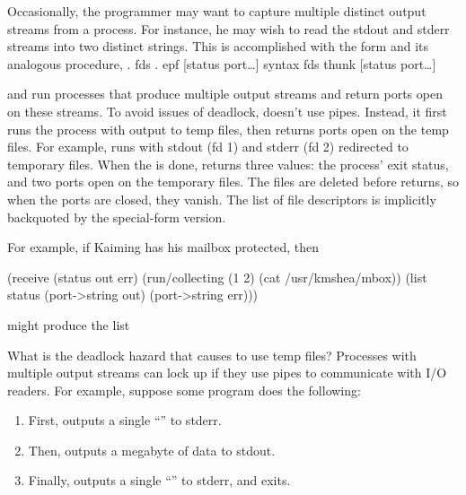 Occasionally, the programmer may want to capture multiple distinct output
streams from a process. For instance, he may wish to read the stdout and
stderr streams into two distinct strings. This is accomplished with the
 form and its analogous procedure, .
%
  {fds . epf} {[status port\ldots]} {syntax}
 {fds thunk} {[status port\ldots]}
\begin{desc}
 and  run processes that produce
multiple output streams and return ports open on these streams.  To avoid
issues of deadlock,  doesn't use pipes. Instead, it first
runs the process with output to temp files, then returns ports open on the
temp files. For example,
%
%
runs  with stdout (fd 1) and stderr (fd 2) redirected to temporary
files.
When the  is done,  returns three values: the
 process' exit status, and two ports open on the temporary files. The
files are deleted before  returns, so when the ports are
closed, they vanish. The  list of file descriptors is implicitly
backquoted by the special-form version.

For example, if Kaiming has his mailbox protected, then
\begin{code}
(receive (status out err)
         (run/collecting (1 2) (cat /usr/kmshea/mbox))
  (list status (port->string out) (port->string err)))\end{code}
%
might produce the list

What is the deadlock hazard that causes  to use temp files?
Processes with multiple output streams can lock up if they use pipes
to communicate with {\Scheme} I/O readers. For example, suppose
some {\Unix} program  does the following:
\begin{enumerate}
    \item  First, outputs a single ``\ex{(}'' to stderr.
    \item Then, outputs a megabyte of data to stdout.
    \item Finally, outputs a single ``\ex{)}'' to stderr, and exits.
\end{enumerate}


\end{desc}
